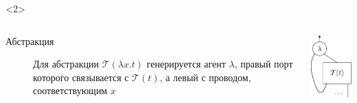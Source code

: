 \documentclass
  [ russian
  , aspectratio=169 %
  ] {beamer}
\begin{document}
\begin{frame}
    \begin{onlyenv}<2>
        \begin{columns}[totalwidth=\textwidth]
            \begin{column}{0.6\linewidth}
                \begin{description}
                    \item[Абстракция] Для абстракции $\mathcal{T}(\lambda x.t)$ генерируется агент $\lambda$, правый порт которого связывается с $\mathcal{T}(t)$, а левый с проводом, соответствующим $x$
                \end{description}
            \end{column}
            \begin{column}{0.4\linewidth}
                \begin{center}
                    \includegraphics[width=0.4\linewidth]{figures/sinot_abs_1.pdf}
                \end{center}
            \end{column}
        \end{columns}
    \end{onlyenv}


\end{frame}
\end{document}
